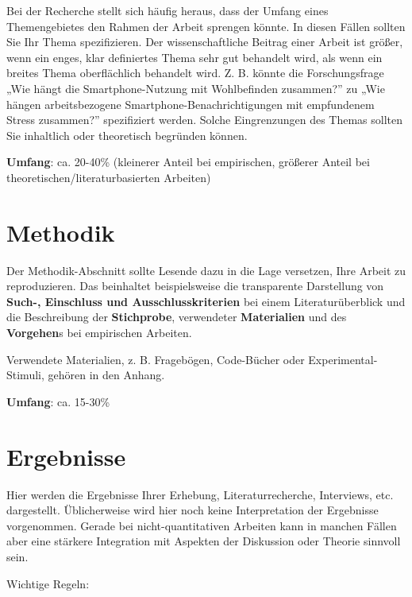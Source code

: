 \documentclass[
  letterpaper,
  DIV=11]{scrreprt}
\begin{document}
Bei der Recherche stellt sich häufig heraus, dass der Umfang eines
Themengebietes den Rahmen der Arbeit sprengen könnte. In diesen Fällen
sollten Sie Ihr Thema spezifizieren. Der wissenschaftliche Beitrag einer
Arbeit ist größer, wenn ein enges, klar definiertes Thema sehr gut
behandelt wird, als wenn ein breites Thema oberflächlich behandelt wird.
Z. B. könnte die Forschungsfrage „Wie hängt die Smartphone-Nutzung mit
Wohlbefinden zusammen?'' zu „Wie hängen arbeitsbezogene
Smartphone-Benachrichtigungen mit empfundenem Stress zusammen?''
spezifiziert werden. Solche Eingrenzungen des Themas sollten Sie
inhaltlich oder theoretisch begründen können.

\textbf{Umfang}: ca. 20-40\% (kleinerer Anteil bei empirischen, größerer
Anteil bei theoretischen/literaturbasierten Arbeiten)

\hypertarget{methodik}{%
\section{Methodik}\label{methodik}}

Der Methodik-Abschnitt sollte Lesende dazu in die Lage versetzen, Ihre
Arbeit zu reproduzieren. Das beinhaltet beispielsweise die transparente
Darstellung von \textbf{Such-, Einschluss und Ausschlusskriterien} bei
einem Literaturüberblick und die Beschreibung der \textbf{Stichprobe},
verwendeter \textbf{Materialien} und des \textbf{Vorgehen}s bei
empirischen Arbeiten.

Verwendete Materialien, z. B. Fragebögen, Code-Bücher oder
Experimental-Stimuli, gehören in den Anhang.

\textbf{Umfang}: ca. 15-30\%

\hypertarget{ergebnisse}{%
\section{Ergebnisse}\label{ergebnisse}}

Hier werden die Ergebnisse Ihrer Erhebung, Literaturrecherche,
Interviews, etc. dargestellt. Üblicherweise wird hier noch keine
Interpretation der Ergebnisse vorgenommen. Gerade bei
nicht-quantitativen Arbeiten kann in manchen Fällen aber eine stärkere
Integration mit Aspekten der Diskussion oder Theorie sinnvoll sein.

Wichtige Regeln:
\end{document}
